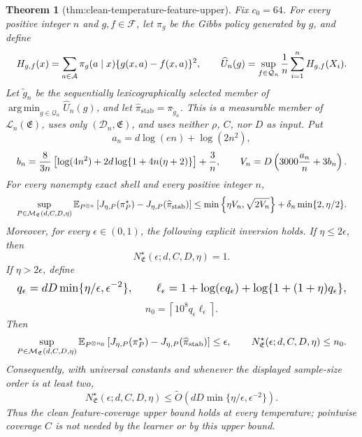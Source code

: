 \documentclass{article}
\newtheorem{theorem}{Theorem}
\begin{document}
\begin{theorem}[thm:clean-temperature-feature-upper]\label{thm:clean-temperature-feature-upper}
Fix \(c_0=64\). For every positive integer \(n\) and \(g,f\in\mathcal F\), let \(\pi_g\) be the Gibbs policy generated by \(g\), and define
\[
\makebox[\linewidth][c]{\resizebox{0.98\linewidth}{!}{\(\displaystyle H_{g,f}(x)=\sum_{a\in\mathcal A}\pi_g(a\mid x)\{g(x,a)-f(x,a)\}^2,
\qquad
\widehat U_n(g)=\sup_{f\in\mathcal Q_n}\frac1n\sum_{i=1}^nH_{g,f}(X_i).\)}}
\]
Let \(\widetilde g_n\) be the sequentially lexicographically selected member of \(\operatorname*{arg\,min}_{g\in\mathcal Q_n}\widehat U_n(g)\), and let \(\widehat\pi_{\mathrm{stab}}=\pi_{\widetilde g_n}\). This is a measurable member of \(\mathcal L_n(\mathfrak E)\), uses only \((\mathcal D_n,\mathfrak E)\), and uses neither \(\rho\), \(C\), nor \(D\) as input. Put
\[
a_n=d\log(en)+\log(2n^2),
\]
\[
\makebox[\linewidth][c]{\resizebox{0.98\linewidth}{!}{\(\displaystyle b_n=\frac{8}{3n}\left[\log(4n^2)+2d\log\{1+4n(\eta+2)\}\right]+\frac3n,
\qquad
V_n=D\left(3000\frac{a_n}{n}+3b_n\right).\)}}
\]
For every nonempty exact shell and every positive integer \(n\),
\[
\makebox[\linewidth][c]{\resizebox{0.98\linewidth}{!}{\(\displaystyle \sup_{P\in\mathcal M_{\mathfrak E}(d,C,D,\eta)}
\mathbb E_{P^{\otimes n}}\left[J_{\eta,P}(\pi_P^\star)-J_{\eta,P}(\widehat\pi_{\mathrm{stab}})\right]
\le
\min\left\{\eta V_n,\sqrt{2V_n}\right\}
+\delta_n\min\{2,\eta/2\}.\)}}
\]
Moreover, for every \(\epsilon\in(0,1)\), the following explicit inversion holds. If \(\eta\le2\epsilon\), then
\[
N^\star_{\mathfrak E}(\epsilon;d,C,D,\eta)=1.
\]
If \(\eta>2\epsilon\), define
\[
\makebox[\linewidth][c]{\resizebox{0.98\linewidth}{!}{\(\displaystyle q_\epsilon=dD\min\{\eta/\epsilon,\epsilon^{-2}\},
\qquad
\ell_\epsilon=1+\log(eq_\epsilon)+\log\{1+(1+\eta)q_\epsilon\},\)}}
\]
\[
n_0=\left\lceil10^8q_\epsilon\ell_\epsilon\right\rceil.
\]
Then
\[
\makebox[\linewidth][c]{\resizebox{0.98\linewidth}{!}{\(\displaystyle \sup_{P\in\mathcal M_{\mathfrak E}(d,C,D,\eta)}
\mathbb E_{P^{\otimes n_0}}\left[J_{\eta,P}(\pi_P^\star)-J_{\eta,P}(\widehat\pi_{\mathrm{stab}})\right]
\le\epsilon,
\qquad
N^\star_{\mathfrak E}(\epsilon;d,C,D,\eta)\le n_0.\)}}
\]
Consequently, with universal constants and whenever the displayed sample-size order is at least two,
\[
N^\star_{\mathfrak E}(\epsilon;d,C,D,\eta)
\le\widetilde O\left(dD\min\{\eta/\epsilon,\epsilon^{-2}\}\right).
\]
Thus the clean feature-coverage upper bound holds at every temperature; pointwise coverage \(C\) is not needed by the learner or by this upper bound.
\end{theorem}
\end{document}
